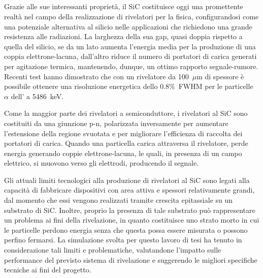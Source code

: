 \subsection{}


Grazie alle sue interessanti proprietà, il SiC costituisce oggi una promettente realtà nel campo della realizzazione di rivelatori per la fisica, configurandosi come una potenziale alternativa al silicio nelle applicazioni che richiedono una grande resistenza alle radiazioni.
La larghezza della sua gap, quasi doppia rispetto a quella del silicio, se da un lato aumenta l'energia media per la produzione di una coppia elettrone-lacuna, dall'altro riduce il numero di portatori di carica generati per agitazione termica, mantenendo, dunque, un ottimo rapporto segnale-rumore. 
Recenti test\cite{tudisco:sensors18} hanno dimostrato che con un rivelatore da 100~$\mu$m di spessore è possibile ottenere una risoluzione energetica dello 0.8\%~FWHM per le particelle $\alpha$ dell' a 5486~keV.


Come la maggior parte dei rivelatori a semiconduttore, i rivelatori al SiC sono costituiti da una giunzione p-n, polarizzata inversamente per aumentare l'estensione della regione svuotata e per migliorare l'efficienza di raccolta dei portatori di carica.
Quando una particella carica attraversa il rivelatore, perde energia generando coppie elettrone-lacuna, le quali, in presenza di un campo elettrico, si muovono verso gli elettrodi, producendo il segnale.



Gli attuali limiti tecnologici alla produzione di rivelatori al SiC sono legati alla capacità di fabbricare dispositivi con area attiva e spessori relativamente grandi, dal momento che essi vengono realizzati tramite crescita epitassiale su un substrato di SiC.
Inoltre, proprio la presenza di tale substrato può rappresentare un problema ai fini della rivelazione, in quanto costituisce uno strato morto in cui le particelle perdono energia senza che questa possa essere misurata o possono perfino fermarsi.
La simulazione svolta per questo lavoro di tesi ha tenuto in considerazione tali limiti e problematiche, valutandone l'impatto sulle performance del previsto sistema di rivelazione e suggerendo le migliori specifiche tecniche ai fini del progetto. 



